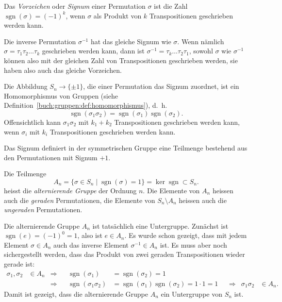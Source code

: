 \begin{definition}
%
%
Das {\em Vorzeichen} oder {\em Signum} einer Permutation $\sigma$ ist
die Zahl $\operatorname{sgn}(\sigma)=(-1)^k$, wenn $\sigma$ als Produkt
von $k$ Transpositionen geschrieben werden kann.
\end{definition}

Die inverse Permutation $\sigma^{-1}$ hat das gleiche Signum wie $\sigma$.
Wenn nämlich $\sigma= \tau_1\tau_2\dots\tau_k$ geschrieben werden kann,
dann ist $\sigma^{-1}=\tau_k\dots\tau_2\tau_1$, sowohl $\sigma$ wie
$\sigma^{-1}$ können also mit der gleichen Zahl von Transpositionen
geschrieben werden, sie haben also auch das gleiche Vorzeichen.

Die Abbildung $S_n\to\{\pm1\}$, die einer Permutation das Signum zuordnet,
ist ein Homomorphismus von Gruppen
(siehe Definition~\ref{buch:gruppen:def:homomorphismus}),
%
d.~h.
\[
\operatorname{sgn}(\sigma_1\sigma_2)
=
\operatorname{sgn}(\sigma_1)
\operatorname{sgn}(\sigma_2).
\]
Offensichtlich kann $\sigma_1\sigma_2$ mit $k_1+k_2$ Transpositionen
geschrieben werden kann, wenn $\sigma_i$ mit $k_i$ Transpositionen geschrieben
werden kann.

Das Signum definiert in der symmetrischen Gruppe eine Teilmenge bestehend
aus den Permutationen mit Signum $+1$.

\begin{definition}
Die Teilmenge
\[
A_n
=
\{
\sigma\in S_n \mid \operatorname{sgn}(\sigma)=1
\}
=
\ker \operatorname{sgn}
\subset
S_n.
\]
%
%
heisst die {\em alternierende Gruppe} der Ordnung $n$.
Die Elemente von $A_n$ heissen auch die {\em geraden} Permutationen,
%
%
die
Elemente von $S_n\setminus A_n$ heissen auch die {\em ungeraden}
Permutationen.
\end{definition}

Die alternierende Gruppe $A_n$ ist tatsächlich eine Untergruppe.
%
Zunächst ist $\operatorname{sgn}(e)=(-1)^0=1$, also ist $e\in A_n$.
Es wurde schon gezeigt, dass mit jedem Element $\sigma\in A_n$ auch
das inverse Element $\sigma^{-1}\in A_n$ ist.
Es muss aber noch sichergestellt werden, dass das Produkt von zwei
geraden Transpositionen wieder gerade ist:
\[
\begin{aligned}
\sigma_1,\sigma_2&\in A_n
&\Rightarrow&&
\operatorname{sgn}(\sigma_1)
&=
\operatorname{sgn}(\sigma_2)
=
1
\\
&&\Rightarrow&&
\operatorname{sgn}(\sigma_1\sigma_2)
&=
\operatorname{sgn}(\sigma_1)
\operatorname{sgn}(\sigma_2)
=
1\cdot 1=1
&&\Rightarrow&
\sigma_1\sigma_2&\in A_n.
\end{aligned}
\]
Damit ist gezeigt, dass die alternierende Gruppe $A_n$ ein Untergruppe von 
$S_n$ ist.

